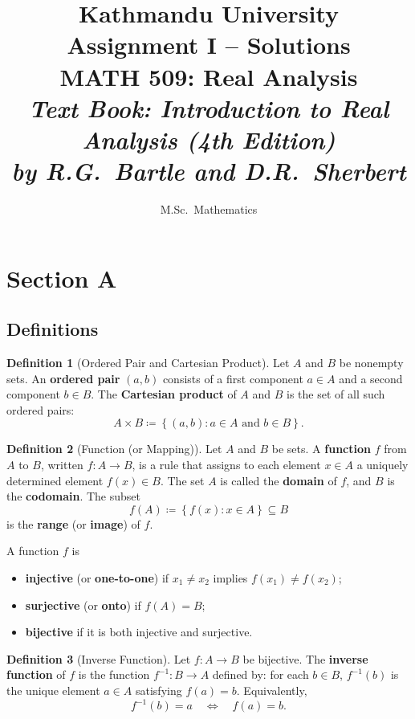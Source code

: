 \documentclass[12pt,a4paper]{article}
\title{
    \textbf{Kathmandu University} \\[0.5cm]
    \Large Assignment I -- Solutions \\[0.3cm]
    \large MATH 509: Real Analysis \\[0.3cm]
    \normalsize \textit{Text Book: Introduction to Real Analysis (4th Edition)} \\
    \normalsize \textit{by R.G.\ Bartle and D.R.\ Sherbert}
}
\author{M.Sc.\ Mathematics}
\date{}
\theoremstyle{definition}
\newtheorem*{definition}{Definition}
\newcommand{\set}[1]{\left\{#1\right\}}
\begin{document}
\maketitle
\tableofcontents
\newpage

\section{Section A}

\subsection{Definitions}

\begin{definition}[Ordered Pair and Cartesian Product]
Let \(A\) and \(B\) be nonempty sets. An \textbf{ordered pair} \((a,b)\) consists of a first component \(a\in A\) and a second component \(b\in B\). The \textbf{Cartesian product} of \(A\) and \(B\) is the set of all such ordered pairs:
\[
    A \times B \coloneqq \set{(a,b) : a\in A \text{ and } b\in B}.
\]
\end{definition}

\begin{definition}[Function (or Mapping)]
Let \(A\) and \(B\) be sets. A \textbf{function} \(f\) from \(A\) to \(B\), written \(f:A\to B\), is a rule that assigns to each element \(x\in A\) a uniquely determined element \(f(x)\in B\).  
The set \(A\) is called the \textbf{domain} of \(f\), and \(B\) is the \textbf{codomain}.  
The subset
\[
    f(A)\coloneqq \set{f(x) : x\in A} \subseteq B
\]
is the \textbf{range} (or \textbf{image}) of \(f\).

A function \(f\) is
\begin{itemize}
    \item \textbf{injective} (or \textbf{one-to-one}) if \(x_1\neq x_2\) implies \(f(x_1)\neq f(x_2)\);
    \item \textbf{surjective} (or \textbf{onto}) if \(f(A)=B\);
    \item \textbf{bijective} if it is both injective and surjective.
\end{itemize}
\end{definition}

\begin{definition}[Inverse Function]
Let \(f:A\to B\) be bijective. The \textbf{inverse function} of \(f\) is the function \(f^{-1}:B\to A\) defined by: for each \(b\in B\), \(f^{-1}(b)\) is the unique element \(a\in A\) satisfying \(f(a)=b\). Equivalently,
\[
    f^{-1}(b)=a \quad\Longleftrightarrow\quad f(a)=b.
\]
\end{definition}
\end{document}

